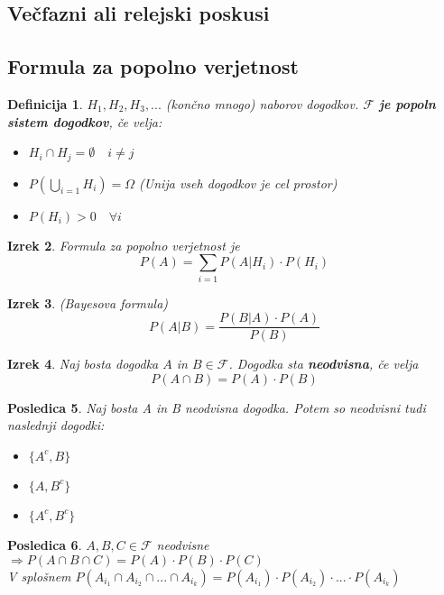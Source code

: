 \documentclass[11pt]{article}
\newtheorem{Izrek}{{\sc Izrek}}[section]
\newtheorem{Posledica}[Izrek]{{\sc Posledica}}
\newtheorem{Definicija}[Izrek]{{\sc Definicija}}
\begin{document}
	\subsection{Večfazni ali relejski poskusi}
	\subsection{Formula za popolno verjetnost}
	\begin{Definicija}
		$H_1,H_2,H_3,...$ (končno mnogo) naborov dogodkov. $\mathcal{F}$ \textbf{je popoln sistem dogodkov}, če velja:
		\begin{itemize}
			\item
			$H_i \cap H_j = \emptyset \quad i \ne j$
			\item
			$ P(\bigcup_{i=1}H_i) = \Omega$ (Unija vseh dogodkov je cel prostor)
			\item
			$P(H_i) > 0 \quad \forall i$	
		\end{itemize}
	\end{Definicija}
	\begin{Izrek}
		Formula za popolno verjetnost je 
		$$P(A) = \sum_{i = 1}{P(A|H_i) \cdot P(H_i)}$$
	\end{Izrek}
	\begin{Izrek}(Bayesova formula)
		$$ P(A|B) = \frac{P(B|A) \cdot P(A)}{P(B)}$$
	\end{Izrek}
	\begin{Izrek}
		Naj bosta dogodka $A$ in $B \in \mathcal{F}$. Dogodka sta \textbf{neodvisna}, če velja $$P(A\cap B) = P(A) \cdot P(B)$$
	\end{Izrek}
	\begin{Posledica}
		Naj bosta A in B neodvisna dogodka. Potem so neodvisni tudi naslednji dogodki:
		\begin{itemize}
			\item
			$\{A^c, B\}$
			\item
			$\{A, B^c\}$
			\item
			$\{A^c, B^c\}$
		\end{itemize}
	\end{Posledica}
	\begin{Posledica}
		$A,B,C \in \mathcal{F}$ neodvisne $ \Rightarrow P(A\cap B \cap C) = P(A) \cdot P(B) \cdot P(C)$
		\\
		V splošnem $P(A_{i_1} \cap A_{i_2} \cap ...\cap A_{i_k}) = P(A_{i_1})\cdot P(A_{i_2}) \cdot ... \cdot P(A_{i_k})$
	\end{Posledica}
	
\end{document}
